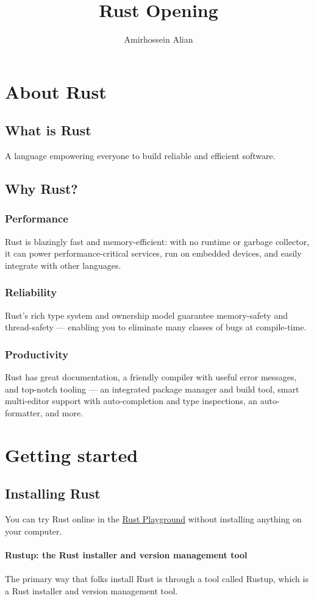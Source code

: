 \documentclass[12pt]{article}
\title{Rust Opening}
\author{Amirhossein Alian}
\begin{document}
    \maketitle
    
    \section{About Rust}
    
        \subsection{What is Rust}
            A language empowering everyone to build reliable and efficient software. 
        \subsection{Why Rust?}
            \subsubsection{Performance}
                Rust is blazingly fast and memory-efficient: with no runtime or garbage collector, it can power performance-critical services, run on embedded devices, and easily integrate with other languages. 
            \subsubsection{Reliability}
                Rust’s rich type system and ownership model guarantee memory-safety and thread-safety — enabling you to eliminate many classes of bugs at compile-time. 
\subsubsection{Productivity}
Rust has great documentation, a friendly compiler with useful error messages, and top-notch tooling — an integrated package manager and build tool, smart multi-editor support with auto-completion and type inspections, an auto-formatter, and more.
\pagebreak
\section{Getting started}
\subsection{Installing Rust}
You can try Rust online in the \href{https://play.rust-lang.org/} {Rust Playground} without installing anything on your computer.
\\\\
\textbf{Rustup: the Rust installer and version management tool}
\\\\
The primary way that folks install Rust is through a tool called Rustup, which is a Rust installer and version management tool.
\end{document}

